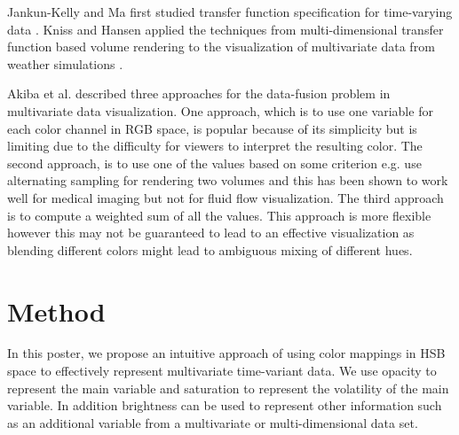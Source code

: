 Jankun-Kelly and Ma first studied  transfer function specification for time-varying data \cite{jankun-kelly_study_2001}.
Kniss and Hansen applied the techniques from multi-dimensional transfer function based volume rendering to the visualization of multivariate data from weather simulations \cite{kniss_volume_2002}.



Akiba et al. \cite{akiba_visualizing_2007} described three approaches for the data-fusion problem in multivariate data visualization.
One approach, which is to use one variable for each color channel in RGB space, is popular because of its simplicity but is limiting due to the difficulty for viewers to interpret the resulting color.
The second approach, is to use one of the values based on some criterion e.g. \cite{hastreiter_integrated_1998}
use alternating sampling for rendering two volumes and this has been shown to work well for medical imaging but not for fluid flow visualization.
The third approach is to compute a weighted sum of all the values. This approach is more flexible however this may not be guaranteed to lead to an effective visualization as blending different colors might lead to ambiguous mixing of different hues.



\section{Method}
In this poster, we propose an intuitive approach of using color mappings in HSB space to effectively represent multivariate time-variant data. We use opacity to represent the main variable and saturation to represent the volatility of the main variable. In addition brightness can be used to represent other information such as an additional variable from a multivariate or multi-dimensional data set. 

